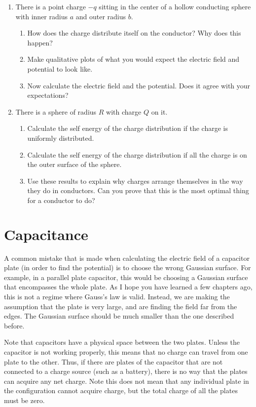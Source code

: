 \documentclass[12pt]{book}
\begin{document}
\begin{enumerate}
 
 \item There is a point charge $-q$ sitting in the center of a hollow conducting sphere with inner radius $a$ and outer radius $b.$
 \begin{enumerate}
 \item How does the charge distribute itself on the conductor? Why does this happen?
 \item Make qualitative plots of what you would expect the electric field and potential to look like.
 \item Now calculate the electric field and the potential. Does it agree with your expectations?
 \end{enumerate}
 \item There is a sphere of radius $R$ with charge $Q$ on it.
 \begin{enumerate}
  \item Calculate the self energy of the charge distribution if the charge is uniformly distributed.
  \item Calculate the self energy of the charge distribution if all the charge is on the outer surface of the sphere.
  \item Use these results to explain why charges arrange themselves in the way they do in conductors. Can you prove that this is the most optimal thing for a conductor to do?
 \end{enumerate}

\end{enumerate}

\chapter{Capacitance}

A common mistake that is made when calculating the electric field of a capacitor plate (in order to find the potential) is to choose the wrong Gaussian surface. For example, in a parallel plate capacitor, this would be choosing a Gaussian surface that encompasses the whole plate. As I hope you have learned a few chapters ago, this is not a regime where Gauss's law is valid. Instead, we are making the assumption that the plate is very large, and are finding the field far from the edges. The Gaussian surface should be much smaller than the one described before.

Note that capacitors have a physical space between the two plates. Unless the capacitor is not working properly, this means that no charge can travel from one plate to the other. Thus, if there are plates of the capacitor that are not connected to a charge source (such as a battery), there is no way that the plates can acquire any net charge. Note this does not mean that any individual plate in the configuration cannot acquire charge, but the total charge of all the plates must be zero.
\end{document}
